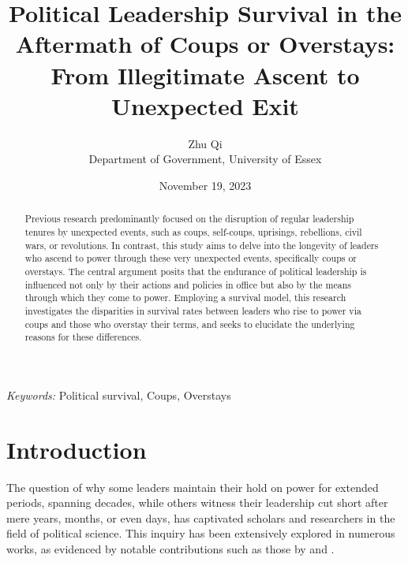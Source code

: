 \documentclass[
  12pt,
  a4paper,
  12pt]{article}
\begin{document}
\def\spacingset#1{\renewcommand{\baselinestretch}%
{#1}\small\normalsize} \spacingset{1}



\date{November 19, 2023}
\title{\bf Political Leadership Survival in the Aftermath of Coups or
Overstays: From Illegitimate Ascent to Unexpected Exit}
\author{
Zhu Qi\\
Department of Government, University of Essex\\
}
\maketitle

\bigskip
\bigskip
\begin{abstract}
Previous research predominantly focused on the disruption of regular
leadership tenures by unexpected events, such as coups, self-coups,
uprisings, rebellions, civil wars, or revolutions. In contrast, this
study aims to delve into the longevity of leaders who ascend to power
through these very unexpected events, specifically coups or overstays.
The central argument posits that the endurance of political leadership
is influenced not only by their actions and policies in office but also
by the means through which they come to power. Employing a survival
model, this research investigates the disparities in survival rates
between leaders who rise to power via coups and those who overstay their
terms, and seeks to elucidate the underlying reasons for these
differences.
\end{abstract}

\noindent%
{\it Keywords:} Political survival, Coups, Overstays
\vfill

\newpage
\spacingset{1.9} %
\ifdefined\Shaded\renewenvironment{Shaded}{\begin{tcolorbox}[enhanced, frame hidden, borderline west={3pt}{0pt}{shadecolor}, interior hidden, breakable, sharp corners, boxrule=0pt]}{\end{tcolorbox}}\fi

\hypertarget{introduction}{%
\section{Introduction}\label{introduction}}

The question of why some leaders maintain their hold on power for
extended periods, spanning decades, while others witness their
leadership cut short after mere years, months, or even days, has
captivated scholars and researchers in the field of political science.
This inquiry has been extensively explored in numerous works, as
evidenced by notable contributions such as those by
\citet{clinton1975politics} and \citet{buenodemesquita2003}.
\end{document}
